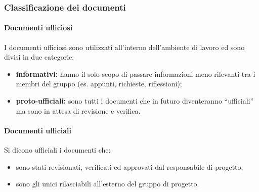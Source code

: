 		\subsubsection{Classificazione dei documenti}
			\paragraph{Documenti ufficiosi}
				I documenti ufficiosi sono utilizzati all'interno dell'ambiente di lavoro ed sono divisi in due categorie:
				\begin{itemize}
					\item \textbf{informativi:} hanno il solo scopo di passare informazioni meno rilevanti tra i membri del gruppo (es. appunti, richieste, riflessioni);
					\item \textbf{proto-ufficiali:} sono tutti i documenti che in futuro diventeranno ``ufficiali'' ma sono in attesa di revisione e verifica.
				\end{itemize}
			\paragraph{Documenti ufficiali}
				Si dicono ufficiali i documenti che:
				\begin{itemize}
					\item sono stati revisionati, verificati ed approvati dal responsabile di progetto;
					\item sono gli unici rilasciabili all'esterno del gruppo di progetto.
				\end{itemize}
